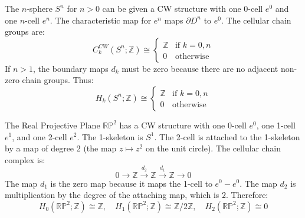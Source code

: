










\begin{example}
The $n$-sphere $S^n$ for $n > 0$ can be given a CW structure with one 0-cell $e^0$ and one $n$-cell $e^n$. The characteristic map for $e^n$ maps $\partial D^n$ to $e^0$.
The cellular chain groups are:
$$C_k^{CW}(S^n; \mathbb{Z}) \cong 
\begin{cases} 
\mathbb{Z} & \text{if } k = 0, n \\
0 & \text{otherwise}
\end{cases}$$
If $n > 1$, the boundary maps $d_k$ must be zero because there are no adjacent non-zero chain groups. Thus:
$$H_k(S^n; \mathbb{Z}) \cong 
\begin{cases} 
\mathbb{Z} & \text{if } k = 0, n \\
0 & \text{otherwise}
\end{cases}$$
\end{example}

\begin{example}
The Real Projective Plane $\mathbb{RP}^2$ has a CW structure with one 0-cell $e^0$, one 1-cell $e^1$, and one 2-cell $e^2$. The 1-skeleton is $S^1$. The 2-cell is attached to the 1-skeleton by a map of degree 2 (the map $z \mapsto z^2$ on the unit circle).
The cellular chain complex is:
$$0 \to \mathbb{Z} \xrightarrow{d_2} \mathbb{Z} \xrightarrow{d_1} \mathbb{Z} \to 0$$
The map $d_1$ is the zero map because it maps the 1-cell to $e^0 - e^0$. The map $d_2$ is multiplication by the degree of the attaching map, which is $2$.
Therefore:
$$H_0(\mathbb{RP}^2; \mathbb{Z}) \cong \mathbb{Z}, \quad H_1(\mathbb{RP}^2; \mathbb{Z}) \cong \mathbb{Z}/2\mathbb{Z}, \quad H_2(\mathbb{RP}^2; \mathbb{Z}) \cong 0$$
\end{example}

